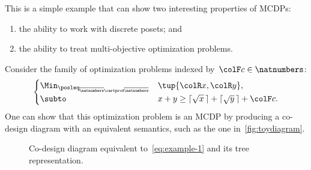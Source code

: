 This is a simple example that can show two interesting properties of MCDPs:
\begin{enumerate}
    \item the ability to work with discrete posets; and
    \item the ability to treat multi-objective optimization problems.
\end{enumerate}
Consider the family of optimization problems indexed by~${\colF c}\in\natnumbers$:
\begin{equation}
    \begin{cases}
        \Min_{\posleq_{\overline{\natnumbers}\cartprod\overline{\natnumbers}}} & \tup{ {\colR x},{\colR y}} ,\\
        \subto & x+y\geq\lceil\sqrt{x}\,\rceil+\lceil\sqrt{y}\,\rceil+{\colF c}.
    \end{cases}\label{eq:example-1}
\end{equation}
One can show that this optimization problem is an MCDP by producing a co-design diagram with an equivalent semantics, such as the one in~\cref{fig:toydiagram}.

\begin{figure}[h]
    
    \caption{Co-design diagram equivalent to~\cref{eq:example-1} and its tree representation.}
\end{figure}

